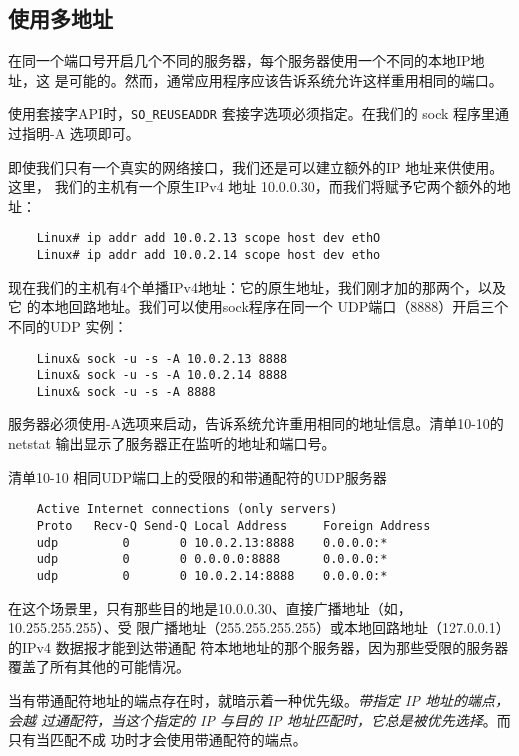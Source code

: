 \subsection{使用多地址}
在同一个端口号开启几个不同的服务器，每个服务器使用一个不同的本地IP地址，这
是可能的。然而，通常应用程序应该告诉系统允许这样重用相同的端口。

\begin{tcolorbox}
    使用套接字API时，\verb|SO_REUSEADDR| 套接字选项必须指定。在我们的
    sock 程序里通过指明-A 选项即可。
\end{tcolorbox}

即使我们只有一个真实的网络接口，我们还是可以建立额外的IP 地址来供使用。这里，
我们的主机有一个原生IPv4 地址 10.0.0.30，而我们将赋予它两个额外的地址：

\begin{verbatim}
    Linux# ip addr add 10.0.2.13 scope host dev ethO
    Linux# ip addr add 10.0.2.14 scope host dev etho
\end{verbatim}

现在我们的主机有4个单播IPv4地址：它的原生地址，我们刚才加的那两个，以及它
的本地回路地址。我们可以使用sock程序在同一个 UDP端口（8888）开启三个不同的UDP
实例：

\begin{verbatim}
    Linux& sock -u -s -A 10.0.2.13 8888
    Linux& sock -u -s -A 10.0.2.14 8888
    Linux& sock -u -s -A 8888
\end{verbatim}

服务器必须使用-A选项来启动，告诉系统允许重用相同的地址信息。清单10-10的
netstat 输出显示了服务器正在监听的地址和端口号。

清单10-10 相同UDP端口上的受限的和带通配符的UDP服务器
\begin{verbatim}
    Active Internet connections (only servers)
    Proto   Recv-Q Send-Q Local Address     Foreign Address
    udp         0       0 10.0.2.13:8888    0.0.0.0:*
    udp         0       0 0.0.0.0:8888      0.0.0.0:*
    udp         0       0 10.0.2.14:8888    0.0.0.0:*
\end{verbatim}

在这个场景里，只有那些目的地是10.0.0.30、直接广播地址（如，10.255.255.255）、受
限广播地址（255.255.255.255）或本地回路地址（127.0.0.1）的IPv4 数据报才能到达带通配
符本地地址的那个服务器，因为那些受限的服务器覆盖了所有其他的可能情况。

当有带通配符地址的端点存在时，就暗示着一种优先级。\emph{带指定 IP 地址的端点，会越
过通配符，当这个指定的 IP 与目的 IP 地址匹配时，它总是被优先选择}。而只有当匹配不成
功时才会使用带通配符的端点。

